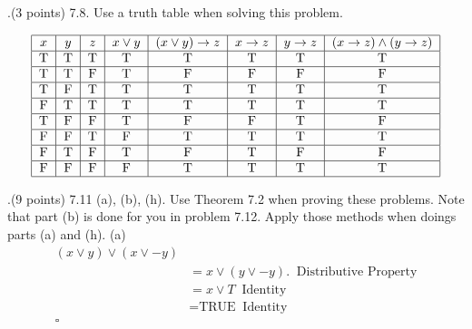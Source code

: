 \documentclass[12pt]{article}
\begin{document}
.(3 points) 7.8.  Use a truth table when solving this problem. 
\vspace{.15in}

\[ %
\begin{tabular}{|c|c|c|c|c|c|c|c|} 
\hline %
$x$ & $y$ & $z$ & $x \vee y$ & $(x \vee y) \rightarrow z$ & $x\rightarrow z$ & $y \rightarrow z$ & $(x \rightarrow z) \wedge (y \rightarrow z)$ \\ 
\hline
T&T&T&T&T&T&T&T \\
\hline
T&T&F&T&F&F&F&F \\
\hline 
T&F&T&T&T&T&T&T \\
\hline
F&T&T&T&T&T&T&T \\
\hline
T&F&F&T&F&F&T&F \\
\hline
F&F&T&F&T&T&T&T \\
\hline 
F&T&F&T&F&T&F&F \\
\hline
F&F&F&F&T&T&T&T \\
\hline

\end{tabular} %
\] 
\vspace{0.5in}



.(9 points) 7.11 (a), (b), (h).  Use Theorem 7.2 when proving these problems.  Note that part (b) is done for you in problem 7.12.  Apply those methods when doings parts (a) and (h).  
\newline
\vspace{.15in}
(a)  \[
\begin{aligned} 
(x \vee y) \vee (x \vee -y) \\
&= x \vee (y \vee -y).  \;\;  \mbox{Distributive Property} \\ %
&= x \vee T \;\; \mbox{Identity}\\
&= \mbox{TRUE} \;\; \mbox{Identity} \\
\square \\
\end{aligned}
\]
\end{document}
